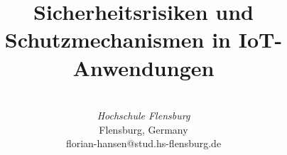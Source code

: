 \documentclass[conference]{IEEEtran}
\begin{document}
\title{Sicherheitsrisiken und Schutzmechanismen in IoT-Anwendungen}
    \author{
       \\
      \textit{Hochschule Flensburg}\\
      Flensburg, Germany \\
      florian-hansen@stud.hs-flensburg.de
    }
  \maketitle

  
  
  
  
  

  
  
  

	
	
\end{document}
